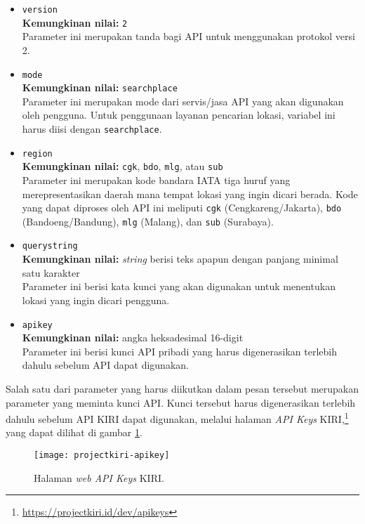 \begin{itemize}
	\item \verb|version|\\
	\textbf{Kemungkinan nilai:} \verb|2|\\
	Parameter ini merupakan tanda bagi API untuk menggunakan protokol versi 2.
	\item \verb|mode|\\
	\textbf{Kemungkinan nilai:} \verb|searchplace|\\
	Parameter ini merupakan mode dari servis/jasa API yang akan digunakan oleh pengguna. Untuk penggunaan layanan pencarian lokasi, variabel ini harus diisi dengan \verb|searchplace|.
	\item \verb|region|\\
	\textbf{Kemungkinan nilai:} \verb|cgk|, \verb|bdo|, \verb|mlg|, atau \verb|sub|\\
	Parameter ini merupakan kode bandara IATA tiga huruf yang merepresentasikan daerah mana tempat lokasi yang ingin dicari berada. Kode yang dapat diproses oleh API ini meliputi \verb|cgk| (Cengkareng/Jakarta), \verb|bdo| (Bandoeng/Bandung), \verb|mlg| (Malang), dan \verb|sub| (Surabaya).
	\item \verb|querystring|\\
	\textbf{Kemungkinan nilai:} \textit{string} berisi teks apapun dengan panjang minimal satu karakter\\
	Parameter ini berisi kata kunci yang akan digunakan untuk menentukan lokasi yang ingin dicari pengguna.
	\item \verb|apikey|\\
	\textbf{Kemungkinan nilai:} angka heksadesimal 16-digit\\
	Parameter ini berisi kunci API pribadi yang harus digenerasikan terlebih dahulu sebelum API dapat digunakan.
\end{itemize}
\vspace{\baselineskip}
Salah satu dari parameter yang harus diikutkan dalam pesan tersebut merupakan parameter yang meminta kunci API. Kunci tersebut harus digenerasikan terlebih dahulu sebelum API KIRI dapat digunakan, melalui halaman \textit{API Keys} KIRI,\footnote{\href{https://projectkiri.id/dev/apikeys}{https://projectkiri.id/dev/apikeys}} yang dapat dilihat di gambar \ref{fig:kiri-apikeypage}.

\begin{figure}[t]
    \centering
    \texttt{[image: projectkiri-apikey]}
    \caption[Halaman \textit{web API Keys} KIRI]{Halaman \textit{web API Keys} KIRI\footnotemark.}
    \label{fig:kiri-apikeypage}
\end{figure}


